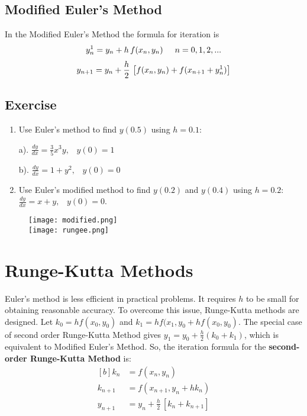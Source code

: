 \documentclass[aima203_lecturenotes_ku.tex]{subfiles}
\begin{document}
\subsection{Modified Euler's Method}
In the Modified Euler's Method the formula for iteration is
\begin{equation}
  \label{eq:9}
  \begin{gathered}[b]
    y^{1}_{n} = y_n + h\,f(x_n,y_n) \hspace{5mm} n=0,1,2,... \\[1mm]
     y_{n+1} = y_n + \frac{h}{2} \,\left [ f(x_n,y_n) + f(x_{n+1} + y^{1}_{n}) \right ]
  \end{gathered}
\end{equation}
\subsection{Exercise}
\begin{enumerate}
    \item Use Euler's method to find $y(0.5)$ using $h=0.1$:
    \begin{multicols}{2}
        a). $\displaystyle \frac{dy}{dx}=\frac{3}{5}x^3y, \;\;\; y(0)=1$
        \columnbreak

        b). $\displaystyle \frac{dy}{dx}=1+y^2, \;\;\; y(0)=0$
    \end{multicols}

    \item Use Euler's modified method to find $y(0.2)$ and $y(0.4)$ using $h=0.2$:\\  $\displaystyle \frac{dy}{dx}=x+y, \;\;\; y(0)=0$.
    \end{enumerate}

\begin{figure}[h!]
  \centering
  \texttt{[image: modified.png]} \\[2cm]

  \texttt{[image: rungee.png]}
\end{figure}
\section{Runge-Kutta Methods}
Euler's method is less efficient in practical problems. It requires $h$ to be small for obtaining reasonable accuracy. To overcome this issue, Runge-Kutta methods are designed.
Let $k_0 =hf(x_0,y_0)$ and $k_1 = hf(x_1, y_0 + hf(x_0,y_0)$. The special case of second order Runge-Kutta Method gives $\displaystyle y_1 = y_0 + \frac{h}{2}(k_0 + k_1)$, which is equivalent to Modified Euler's Method. So, the iteration formula for the \textbf{second-order Runge-Kutta Method} is:
\begin{equation}
  \label{rungesecond}
  \begin{aligned}[b]
    k_n &= f(x_n,y_n) \\[1mm]
    k_{n+1} &= f(x_{n+1},y_n + hk_n) \\[1mm]
    y_{n+1} &= y_n + \frac{h}{2} \,\left [ k_n + k_{n+1} \right ]
  \end{aligned}
\end{equation}
\end{document}
